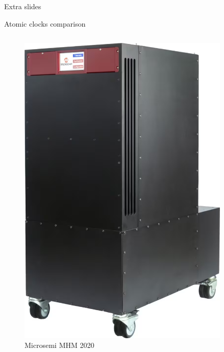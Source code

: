 \begin{frame}[standout]
    Extra slides
\end{frame}



\begin{frame}{Atomic clocks comparison}

    \begin{columns}[c, onlytextwidth]

        \begin{column}{0.25\textwidth}

            \begin{figure}[H]
                \centering
                \includegraphics[width=0.9\textwidth]{img/Microsemi-MHM-2020.png}
                \caption{Microsemi MHM 2020}
            \end{figure}

        \end{column}


\end{columns}
\end{frame}
